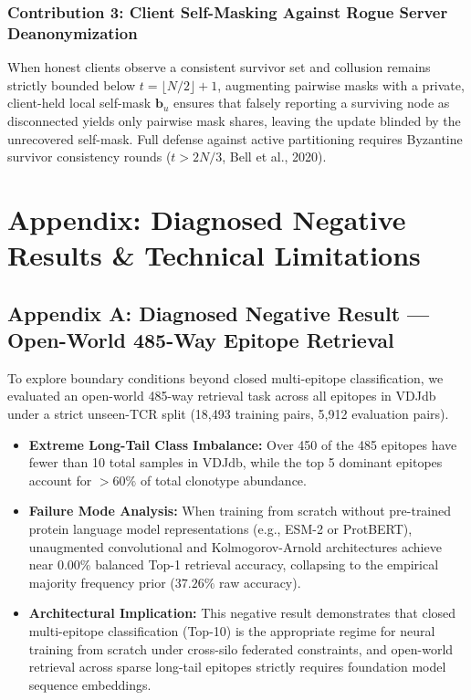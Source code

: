 \documentclass[11pt,a4paper]{report}
\begin{document}
\subsection*{Contribution 3: Client Self-Masking Against Rogue Server Deanonymization}
When honest clients observe a consistent survivor set and collusion remains strictly bounded below $t = \lfloor N/2 \rfloor + 1$, augmenting pairwise masks with a private, client-held local self-mask $\mathbf{b}_u$ ensures that falsely reporting a surviving node as disconnected yields only pairwise mask shares, leaving the update blinded by the unrecovered self-mask. Full defense against active partitioning requires Byzantine survivor consistency rounds ($t > 2N/3$, Bell et al., 2020).

\chapter*{Appendix: Diagnosed Negative Results \& Technical Limitations}

\section*{Appendix A: Diagnosed Negative Result --- Open-World 485-Way Epitope Retrieval}
To explore boundary conditions beyond closed multi-epitope classification, we evaluated an open-world 485-way retrieval task across all epitopes in VDJdb under a strict unseen-TCR split (18{,}493 training pairs, 5{,}912 evaluation pairs).
\begin{itemize}[itemsep=3pt]
  \item \textbf{Extreme Long-Tail Class Imbalance:} Over 450 of the 485 epitopes have fewer than 10 total samples in VDJdb, while the top 5 dominant epitopes account for $>60\%$ of total clonotype abundance.
  \item \textbf{Failure Mode Analysis:} When training from scratch without pre-trained protein language model representations (e.g., ESM-2 or ProtBERT), unaugmented convolutional and Kolmogorov-Arnold architectures achieve near 0.00\% balanced Top-1 retrieval accuracy, collapsing to the empirical majority frequency prior ($37.26\%$ raw accuracy).
  \item \textbf{Architectural Implication:} This negative result demonstrates that closed multi-epitope classification (Top-10) is the appropriate regime for neural training from scratch under cross-silo federated constraints, and open-world retrieval across sparse long-tail epitopes strictly requires foundation model sequence embeddings.
\end{itemize}
\end{document}
